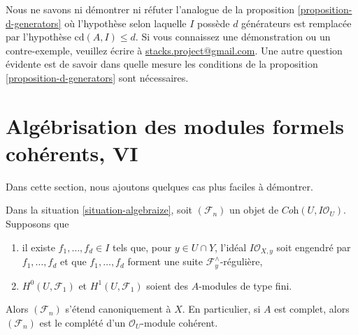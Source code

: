 \begin{remark}
\label{remark-question}
Nous ne savons ni démontrer ni réfuter l'analogue de la
proposition \ref{proposition-d-generators}
où l'hypothèse selon laquelle $I$ possède $d$ générateurs
est remplacée par l'hypothèse $\text{cd}(A, I) \leq d$.
Si vous connaissez une démonstration ou un contre-exemple, veuillez écrire à
\href{mailto:stacks.project@gmail.com}{stacks.project@gmail.com}.
Une autre question évidente est de savoir dans quelle mesure les conditions de la
proposition \ref{proposition-d-generators}
sont nécessaires.
\end{remark}




\section{Algébrisation des modules formels cohérents, VI}
\label{section-algebraization-modules-yet-more}

\noindent
Dans cette section, nous ajoutons quelques cas plus faciles à démontrer.

\begin{proposition}
\label{proposition-algebraization-regular-sequence}
Dans la situation \ref{situation-algebraize}, soit
$(\mathcal{F}_n)$ un objet de $\textit{Coh}(U, I\mathcal{O}_U)$.
Supposons que
\begin{enumerate}
\item il existe $f_1, \ldots, f_d \in I$ tels que,
pour $y \in U \cap Y$, l'idéal $I\mathcal{O}_{X, y}$
soit engendré par $f_1, \ldots, f_d$ et que
$f_1, \ldots, f_d$ forment une suite $\mathcal{F}_y^\wedge$-régulière,
\item $H^0(U, \mathcal{F}_1)$ et $H^1(U, \mathcal{F}_1)$
soient des $A$-modules de type fini.
\end{enumerate}
Alors $(\mathcal{F}_n)$ s'étend canoniquement à $X$. En particulier, si $A$
est complet, alors $(\mathcal{F}_n)$ est le complété d'un
$\mathcal{O}_U$-module cohérent.
\end{proposition}


